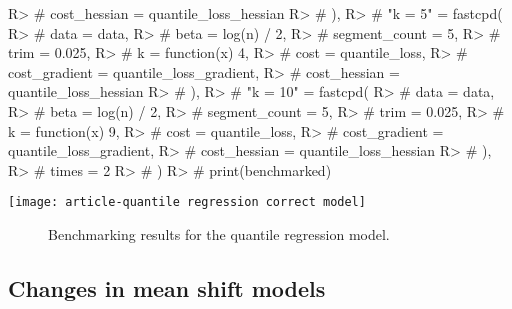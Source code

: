 \documentclass[article]{jss}
\begin{document}
\begin{Schunk}
\begin{Sinput}
R> #     cost_hessian = quantile_loss_hessian
R> #   ),
R> #   "k = 5" = fastcpd(
R> #     data = data,
R> #     beta = log(n) / 2,
R> #     segment_count = 5,
R> #     trim = 0.025,
R> #     k = function(x) 4,
R> #     cost = quantile_loss,
R> #     cost_gradient = quantile_loss_gradient,
R> #     cost_hessian = quantile_loss_hessian
R> #   ),
R> #   "k = 10" = fastcpd(
R> #     data = data,
R> #     beta = log(n) / 2,
R> #     segment_count = 5,
R> #     trim = 0.025,
R> #     k = function(x) 9,
R> #     cost = quantile_loss,
R> #     cost_gradient = quantile_loss_gradient,
R> #     cost_hessian = quantile_loss_hessian
R> #   ),
R> #   times = 2
R> # )
R> # print(benchmarked)
\end{Sinput}
\end{Schunk}
\texttt{[image: article-quantile regression correct model]}
%

\begin{figure}[t!]
\centering
\caption{\label{fig:quantile regression bench mark} Benchmarking results for
the quantile regression model.}
\end{figure}

\subsection{Changes in mean shift models} \label{sec:mean shift model}
\end{document}

